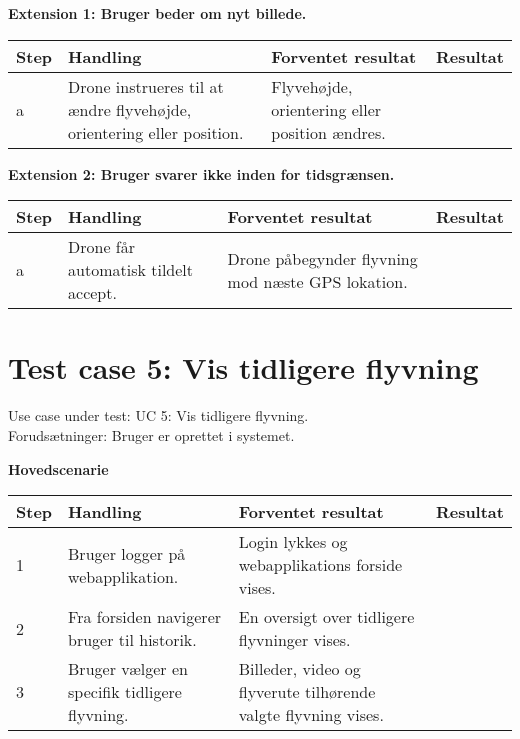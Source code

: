 \textbf{Extension 1: Bruger beder om nyt billede.}
\begin{table}[H]
	\centering
		\begin{tabular}{|l|p{5 cm}|p{5 cm}|p{3.5 cm}|} 
		\hline
			Step & Handling & Forventet resultat & Resultat\\ \hline
			a & Drone instrueres til at \newline ændre flyvehøjde, orientering eller position. & Flyvehøjde, orientering eller position ændres. & \\ \hline
		\end{tabular}
\end{table}

\textbf{Extension 2: Bruger svarer ikke inden for tidsgrænsen.}
\begin{table}[H]
	\centering
		\begin{tabular}{|l|p{5 cm}|p{5 cm}|p{3.5 cm}|} 
		\hline
			Step & Handling & Forventet resultat & Resultat\\ \hline
			a & Drone får automatisk tildelt accept. & Drone påbegynder flyvning mod næste GPS lokation. & \\ \hline
		\end{tabular}
\end{table}

\newpage
\section{Test case 5: Vis tidligere flyvning}
Use case under test: UC 5: Vis tidligere flyvning.\\
Forudsætninger:	Bruger er oprettet i systemet.

\textbf{Hovedscenarie}
\begin{table}[H]
	\centering
		\begin{tabular}{|l|p{5 cm}|p{5 cm}|p{3.5 cm}|} 
		\hline
			Step & Handling & Forventet resultat & Resultat\\ \hline
			1 & Bruger logger på \newline webapplikation. & Login lykkes og webapplikations forside vises. &  \\ \hline
			2 & Fra forsiden navigerer \newline bruger til historik. & En oversigt over tidligere \newline flyvninger vises. & \\ \hline
			3 & Bruger vælger en specifik \newline tidligere flyvning. &  Billeder, video og flyverute \newline tilhørende valgte flyvning \newline vises. & \\ \hline			
		\end{tabular}
\end{table}

